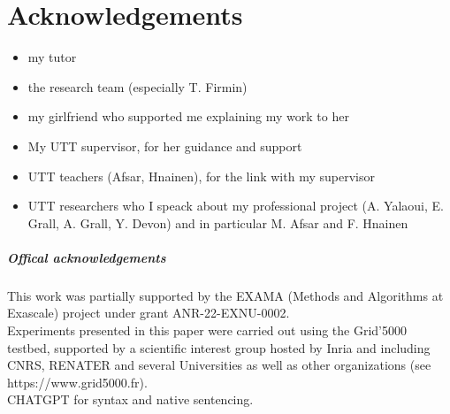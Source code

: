 \chapter*{Acknowledgements}
\begin{itemize}
    \item my tutor
    \item the research team (especially T. Firmin)
    \item my girlfriend who supported me explaining my work to her
    \item My UTT supervisor, for her guidance and support
    \item UTT teachers (Afsar, Hnainen), for the link with my supervisor
    \item UTT researchers who I speack about my professional project (A. Yalaoui, E. Grall, A. Grall, Y. Devon) and in particular M. Afsar and F. Hnainen
\end{itemize}

\paragraph{Offical acknowledgements}
This work was partially supported by the EXAMA (Methods and Algorithms at Exascale) project under grant ANR-22-EXNU-0002.\\
Experiments presented in this paper were carried out using the Grid'5000 testbed, supported by a scientific interest group hosted by Inria and including CNRS, RENATER and several Universities as well as other organizations (see https://www.grid5000.fr).\\
CHATGPT for syntax and native sentencing. 